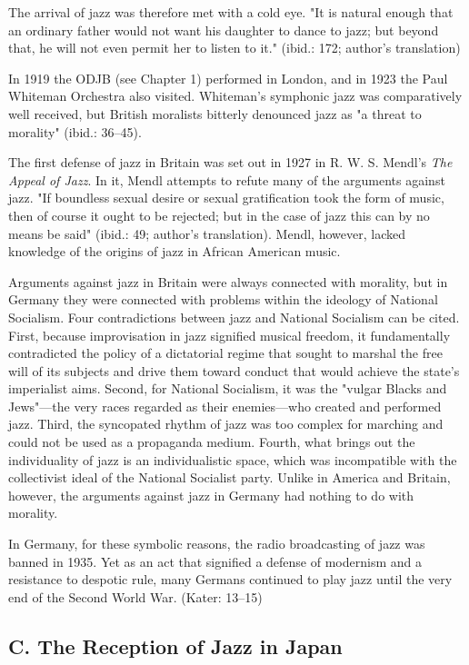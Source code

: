The arrival of jazz was therefore met with a cold eye. "It is natural enough that an ordinary father would not want his daughter to dance to jazz; but beyond that, he will not even permit her to listen to it." (ibid.: 172; author's translation)

In 1919 the ODJB (see Chapter 1) performed in London, and in 1923 the Paul Whiteman Orchestra also visited. Whiteman's symphonic jazz was comparatively well received, but British moralists bitterly denounced jazz as "a threat to morality" (ibid.: 36–45).

The first defense of jazz in Britain was set out in 1927 in R. W. S. Mendl's \textit{The Appeal of Jazz}. In it, Mendl attempts to refute many of the arguments against jazz. "If boundless sexual desire or sexual gratification took the form of music, then of course it ought to be rejected; but in the case of jazz this can by no means be said" (ibid.: 49; author's translation). Mendl, however, lacked knowledge of the origins of jazz in African American music.

Arguments against jazz in Britain were always connected with morality, but in Germany they were connected with problems within the ideology of National Socialism. Four contradictions between jazz and National Socialism can be cited. First, because improvisation in jazz signified musical freedom, it fundamentally contradicted the policy of a dictatorial regime that sought to marshal the free will of its subjects and drive them toward conduct that would achieve the state's imperialist aims. Second, for National Socialism, it was the "vulgar Blacks and Jews"—the very races regarded as their enemies—who created and performed jazz. Third, the syncopated rhythm of jazz was too complex for marching and could not be used as a propaganda medium. Fourth, what brings out the individuality of jazz is an individualistic space, which was incompatible with the collectivist ideal of the National Socialist party. Unlike in America and Britain, however, the arguments against jazz in Germany had nothing to do with morality.

In Germany, for these symbolic reasons, the radio broadcasting of jazz was banned in 1935. Yet as an act that signified a defense of modernism and a resistance to despotic rule, many Germans continued to play jazz until the very end of the Second World War. (Kater: 13–15)

\subsection{C. The Reception of Jazz in Japan}

